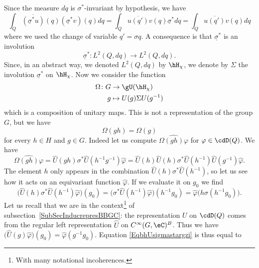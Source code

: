 Since the measure $dq$ is $\sigma^*$-invariant by hypothesis, we have
\begin{equation}
	\int_Q\overline{ (\underline\sigma^*u) }(q)(\underline\sigma^*v)(q)dq=\int_Q\overline{ u(q') }v(q)\underline\sigma^*dq=\int_Q\overline{ u(q') }v(q)dq
\end{equation}
where we used the change of variable $q'=\sigma q$. A consequence is that $\underline\sigma^*$ is an involution
\begin{equation}
	\underline\sigma^*\colon L^2(Q,dq)\to L^2(Q,dq).
\end{equation}
Since, in an abstract way, we denoted $L^2(Q,dq)$ by $\hH_{\chi}$, we denote by $\Sigma$ the involution $\underline\sigma^*$ on $\hH_{\chi}$. Now we consider the function
\begin{equation}
	\begin{aligned}
		\Omega\colon G&\to \gU(\hH_{\chi}) \\
		g&\mapsto U(g)\Sigma U(g^{-1})
	\end{aligned}
\end{equation}
which is a composition of unitary maps. This is not a representation of the group $G$, but we have
\begin{equation}
	\Omega(gh)=\Omega(g)
\end{equation}
for every $h\in H$ and $g\in G$. Indeed let us compute $\widehat{\Omega(gh)\varphi}$ for $\varphi\in\cdD(Q)$. We have
\begin{equation}		\label{EqwOshvhvkl}
		\widehat{\Omega(gh)\varphi}=\hat U(gh)\sigma^*\hat U(h^{-1}g^{-1})\hat\varphi
		=\hat U(h)\hat U(h)\sigma^*\hat U(h^{-1})\hat U(g^{-1})\hat\varphi.
\end{equation}
The element $h$ only appears in the combination $\hat U(h)\sigma^*\hat U(h^{-1})$, so let us see how it acts on an equivariant function $\hat \varphi$. If we evaluate it on $g_0$ we find
\begin{equation}		\label{EqbhUsigmastargzi}
		\big( \hat U(h)\sigma^*\hat U(h^{-1})\hat\varphi \big)(g_0)=\big( \sigma^*\hat U(h^{-1})\hat\varphi \big)(h^{-1}g_0)
		=\hat\varphi\big( h\sigma(h^{-1}g_0) \big).
\end{equation}
Let us recall that we are in the context\footnote{With many notational incoherences.} of subsection~\ref{SubSecInducrepresBBGC}: the representation $U$ on $\cdD(Q)$ comes from the regular left representation $\hat U$ on $ C^{\infty}(G,\eC)^B$. Thus we have $\big( \hat U(g)\hat\varphi \big)(g_0)=\hat\varphi(g^{-1}g_0)$. Equation \eqref{EqbhUsigmastargzi} is thus equal to
